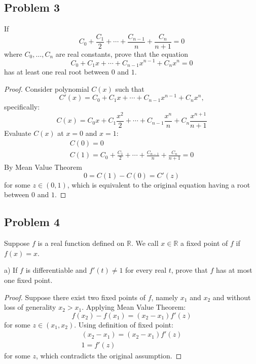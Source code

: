 \documentclass{article}
\newcommand{\R}{\mathbb{R}}
\begin{document}
\subsection*{Problem 3}

\begin{tcolorbox}
If
\[ C_0 + \frac{C_1}{2} + \cdots + \frac{C_{n-1}}{n} + \frac{C_n}{n+1} = 0 \]
where $C_0, \dots , C_n$ are real constants, prove that the equation
\[ C_0 + C_1 x + \cdots + C_{n-1} x^{n-1} + C_n x^n = 0 \]
has at least one real root between $0$ and $1$.
\end{tcolorbox}

\begin{proof}

Consider polynomial $C(x)$ such that
\[ C'(x) = C_0 + C_1 x + \cdots + C_{n-1} x^{n-1} + C_n x^n, \]
specifically:
\[ C(x) = C_0 x + C_1 \frac{x^2}{2} + \cdots + C_{n-1} \frac{x^n}{n} + C_n \frac{x^{n+1}}{n+1} \]
Evaluate $C(x)$ at $x=0$ and $x=1$:
\begin{gather*}
    C(0) = 0 \\
    C(1) = C_0 + \frac{C_1}{2} + \cdots + \frac{C_{n-1}}{n} + \frac{C_n}{n+1} = 0
\end{gather*}
By Mean Value Theorem
\[ 0 = C(1) - C(0) = C'(z) \]
for some $z \in (0,1)$, which is equivalent to the original equation having a root between $0$ and $1$.

\end{proof}


\subsection*{Problem 4}

\begin{tcolorbox}
Suppose $f$ is a real function defined on $\R$.
We call $x \in \R$ a fixed point of $f$ if $f(x) = x$.

a) If $f$ is differentiable and $f'(t) \neq 1$ for every real $t$, prove that $f$ has at most one fixed point.
\end{tcolorbox}

\begin{proof}

Suppose there exist two fixed points of $f$, namely $x_1$ and $x_2$ and without loss of generality $x_2 > x_1$.
Applying Mean Value Theorem:
\[ f(x_2) - f(x_1) = (x_2 - x_1) f'(z) \]
for some $z \in (x_1, x_2)$. Using definition of fixed point:
\begin{gather*}
    (x_2 - x_1) = (x_2 - x_1) f'(z) \\
    1 = f'(z)
\end{gather*}
for some $z$, which contradicts the original assumption.

\end{proof}
\end{document}
